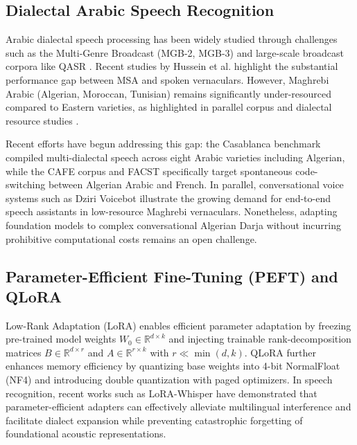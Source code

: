 \documentclass[11pt,a4paper]{article}
\begin{document}
\subsection{Dialectal Arabic Speech Recognition}
Arabic dialectal speech processing has been widely studied through challenges such as the Multi-Genre Broadcast (MGB-2, MGB-3) \cite{ali2016mgb2} and large-scale broadcast corpora like QASR \cite{mubarak2021qasr}. Recent studies by Hussein et al. \cite{hussein2021arabic_asr} highlight the substantial performance gap between MSA and spoken vernaculars. However, Maghrebi Arabic (Algerian, Moroccan, Tunisian) remains significantly under-resourced compared to Eastern varieties, as highlighted in parallel corpus and dialectal resource studies \cite{meftouh2015padic, tachicart2014moroccan}. 

Recent efforts have begun addressing this gap: the Casablanca benchmark \cite{talafha2024casablanca} compiled multi-dialectal speech across eight Arabic varieties including Algerian, while the CAFE corpus \cite{lachemat2024cafe} and FACST \cite{amazouz2018facst} specifically target spontaneous code-switching between Algerian Arabic and French. In parallel, conversational voice systems such as Dziri Voicebot \cite{lanasri2026dzirivoicebot} illustrate the growing demand for end-to-end speech assistants in low-resource Maghrebi vernaculars. Nonetheless, adapting foundation models to complex conversational Algerian Darja without incurring prohibitive computational costs remains an open challenge.

\subsection{Parameter-Efficient Fine-Tuning (PEFT) and QLoRA}
Low-Rank Adaptation (LoRA) \cite{hu2021lora} enables efficient parameter adaptation by freezing pre-trained model weights $W_0 \in \mathbb{R}^{d \times k}$ and injecting trainable rank-decomposition matrices $B \in \mathbb{R}^{d \times r}$ and $A \in \mathbb{R}^{r \times k}$ with $r \ll \min(d, k)$. QLoRA \cite{dettmers2023qlora} further enhances memory efficiency by quantizing base weights into 4-bit NormalFloat (NF4) and introducing double quantization with paged optimizers. In speech recognition, recent works such as LoRA-Whisper \cite{song2024lorawhisper} have demonstrated that parameter-efficient adapters can effectively alleviate multilingual interference and facilitate dialect expansion while preventing catastrophic forgetting of foundational acoustic representations.
\end{document}
